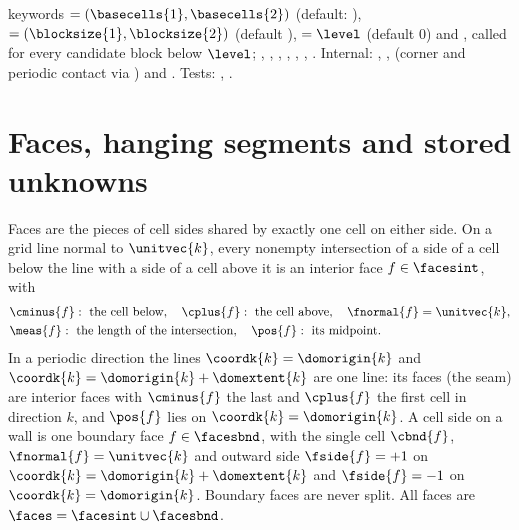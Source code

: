 \begin{implnote}
 keywords  $=(\basecells{1},\basecells{2})$
(default: ),  $=(\blocksize{1},\blocksize{2})$
(default ),  $=\level$ (default 0) and
, called for every candidate block below
$\level$; , , ,
, , , .
Internal: ,
,
 (corner and periodic contact via
) and
. Tests:
,
.
\end{implnote}

\section{Faces, hanging segments and stored unknowns}\label{sec:mesh:faces}
Faces are the pieces of cell sides shared by exactly one cell on either side.
On a grid line normal to $\unitvec{k}$, every nonempty intersection of a side
of a cell below the line with a side of a cell above it is an interior face
$f\in\facesint$, with
\begin{equation}\label{eq:mesh:face}
  \begin{aligned}
    &\cminus{f}:\ \text{the cell below},\quad \cplus{f}:\ \text{the cell above},\quad
    \fnormal{f}=\unitvec{k},\\
    &\meas{f}:\ \text{the length of the intersection},\quad \pos{f}:\ \text{its midpoint}.
  \end{aligned}
\end{equation}
In a periodic direction the lines $\coordk{k}=\domorigin{k}$ and
$\coordk{k}=\domorigin{k}+\domextent{k}$ are one line: its faces (the seam) are
interior faces with $\cminus{f}$ the last and $\cplus{f}$ the first cell in
direction $k$, and $\pos{f}$ lies on $\coordk{k}=\domorigin{k}$. A cell side on a wall
is one boundary face $f\in\facesbnd$, with the single cell $\cbnd{f}$,
$\fnormal{f}=\unitvec{k}$ and outward side $\fside{f}=+1$ on
$\coordk{k}=\domorigin{k}+\domextent{k}$ and $\fside{f}=-1$ on $\coordk{k}=\domorigin{k}$.
Boundary faces are never split. All faces are $\faces=\facesint\cup\facesbnd$.

